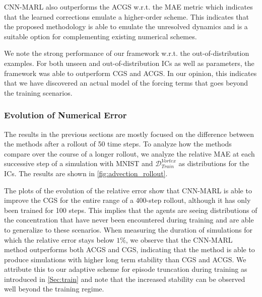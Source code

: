 \documentclass{article}
\theoremstyle{plain}
\theoremstyle{definition}
\theoremstyle{remark}
\begin{document}
CNN-MARL also outperforms the ACGS w.r.t. the MAE metric which indicates that the learned corrections  emulate a higher-order scheme. This indicates that the proposed methodology is  able to emulate the unresolved dynamics and is a suitable option for complementing existing numerical schemes.

We note the strong performance of our framework w.r.t. the out-of-distribution examples. For both unseen and out-of-distribution ICs as well as parameters, the framework was able to outperform CGS and ACGS. In our opinion, this indicates that we have discovered an actual model of the forcing terms that goes beyond the training scenarios. 

\subsubsection{Evolution of Numerical Error}
The results in the previous sections are mostly focused on the difference between the methods after a rollout of 50 time steps. To analyze how the methods compare over the course of a longer rollout, we analyze the relative MAE at each successive step of a simulation with MNIST and $\mathcal D^{Vortex}_{Train}$ as distributions for the ICs. The results are shown in \cref{fig:advection_rollout}. 

The plots of the evolution of the relative error show that CNN-MARL is able to improve the CGS for the entire range of a 400-step rollout, although it has only been trained for 100 steps. This implies that the agents are seeing distributions of the concentration that have never been encountered during training and are able to generalize to these scenarios. When measuring the duration of simulations for which the relative error stays below $1\%$, we observe that the CNN-MARL method outperforms both ACGS and CGS, indicating that the method is able to produce simulations with higher long term stability than CGS and ACGS. We attribute this to our adaptive scheme for episode truncation during training as introduced in \cref{Sec:train} and note that the increased stability can be observed well beyond the training regime.
\end{document}
